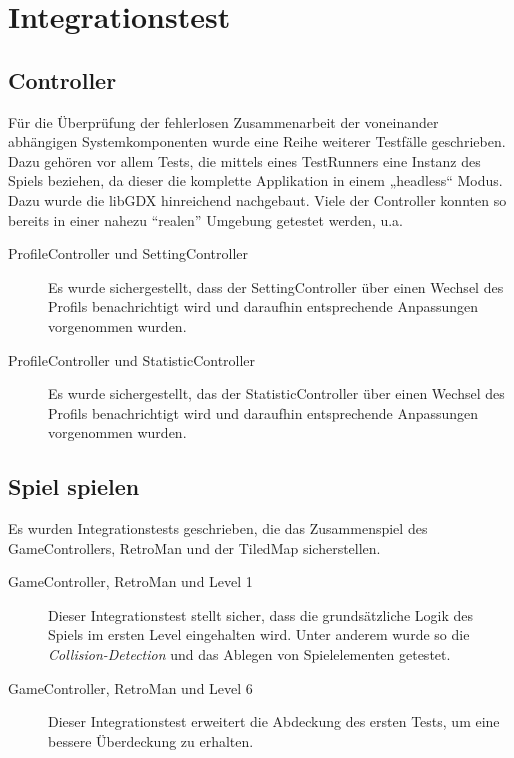 \documentclass[parskip=full]{scrreprt}
\begin{document}
\section{Integrationstest}

\subsection{Controller}

Für die Überprüfung der fehlerlosen Zusammenarbeit der voneinander abhängigen Systemkomponenten wurde eine Reihe weiterer Testfälle geschrieben. Dazu gehören vor allem Tests, die mittels eines TestRunners eine Instanz des Spiels beziehen, da dieser die komplette Applikation in einem „headless“ Modus. Dazu wurde die libGDX hinreichend nachgebaut. Viele der Controller konnten so bereits in einer nahezu \enquote{realen} Umgebung getestet werden, u.a.

\begin{description}
	\item[ProfileController und SettingController] Es wurde sichergestellt, dass der SettingController über einen Wechsel des Profils benachrichtigt wird und daraufhin entsprechende Anpassungen vorgenommen wurden.
	\item[ProfileController und StatisticController] Es wurde sichergestellt, das der StatisticController über einen Wechsel des Profils benachrichtigt wird und daraufhin entsprechende Anpassungen vorgenommen wurden.
\end{description}

\subsection{Spiel spielen}

Es wurden Integrationstests geschrieben, die das Zusammenspiel des GameControllers, RetroMan und der TiledMap sicherstellen.

\begin{description}
	\item[GameController, RetroMan und Level 1] Dieser Integrationstest stellt sicher, dass die grundsätzliche Logik des Spiels im ersten Level eingehalten wird. Unter anderem wurde so die \textit{Collision-Detection} und das Ablegen von Spielelementen getestet.
	\item[GameController, RetroMan und Level 6] Dieser Integrationstest erweitert die Abdeckung des ersten Tests, um eine bessere Überdeckung zu erhalten.
\end{description}
\end{document}

